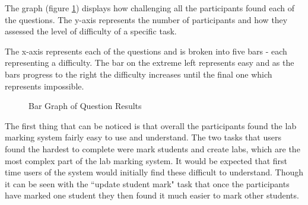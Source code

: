 \documentclass[11pt]{report}
\begin{document}
\noindent The graph (figure \ref{graph:results}) displays how challenging all the participants found each of the questions. The y-axis represents the number of participants and how they assessed the level of difficulty of a specific task. 

\newpage
The x-axis represents each of the questions and is broken  into five bars - each representing a difficulty. The bar on the extreme left  represents easy and as the bars progress to the right the difficulty increases until the final one which represents impossible.  

\noindent
\begin{figure}[H]
\caption{Bar Graph of Question Results}
\label{graph:results}
\end{figure}

The first thing that can be noticed is that overall the participants found the lab marking system  fairly easy to use and understand. The two tasks that users found the hardest to complete were mark students and create labs, which are the most complex part of the lab marking system. It would be expected that first time users of the system would initially find these difficult to understand. Though it can be seen with the ``update student mark" task that  once the participants have marked one student they then found it much easier to mark other students. 
\end{document}
